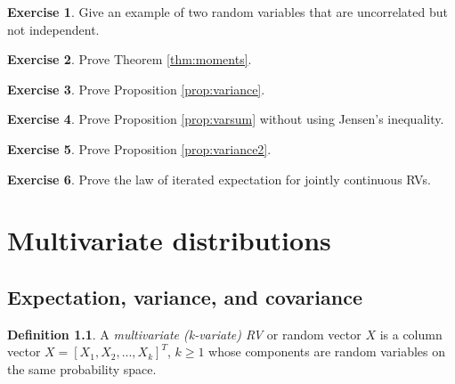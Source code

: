 \documentclass{book}
\theoremstyle{plain}%
\theoremstyle{definition}
\newtheorem{definition}{Definition}[section]
\newtheorem{exercise}{Exercise}[chapter]
\begin{document}
\begin{exercise}
Give an example of two random variables that are uncorrelated but not independent.
\end{exercise}

\begin{exercise}
Prove Theorem \ref{thm:moments}.
\end{exercise}

\begin{exercise}
Prove Proposition \ref{prop:variance}.
\end{exercise}

\begin{exercise}
Prove Proposition \ref{prop:varsum} without using Jensen's inequality.
\end{exercise}

\begin{exercise}
Prove Proposition \ref{prop:variance2}.
\end{exercise}

\begin{exercise}
Prove the law of iterated expectation for jointly continuous RVs.
\end{exercise}

\chapter{Multivariate distributions}

\section{Expectation, variance, and covariance}

\begin{definition}
A \textit{multivariate (k-variate) RV} or random vector $X$ is a column vector $X = [X_1,X_2,...,X_k]^T$, $k \geq 1$ whose components are random variables on the same probability space.
\end{definition}
\end{document}
